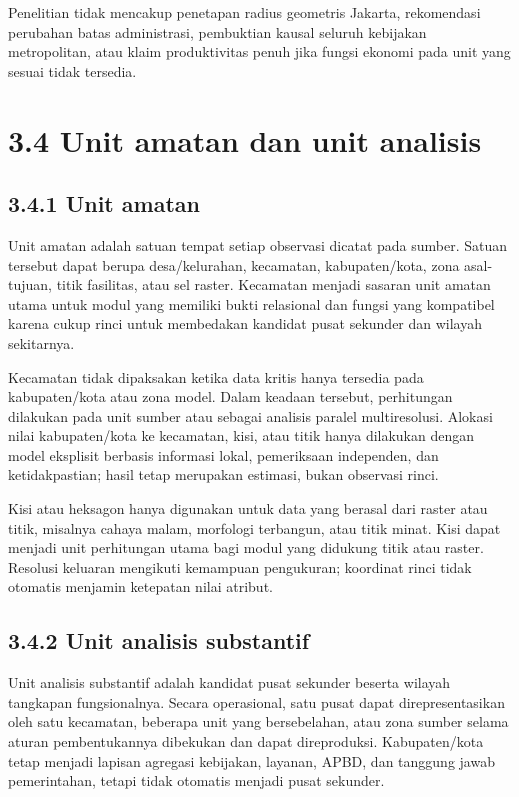 \documentclass[
  indonesian,
  11pt,
  a4paper,
  oneside,
  openany]{report}
\begin{document}
Penelitian tidak mencakup penetapan radius geometris Jakarta,
rekomendasi perubahan batas administrasi, pembuktian kausal seluruh
kebijakan metropolitan, atau klaim produktivitas penuh jika fungsi
ekonomi pada unit yang sesuai tidak tersedia.

\section{3.4 Unit amatan dan unit
analisis}\label{unit-amatan-dan-unit-analisis}

\subsection{3.4.1 Unit amatan}\label{unit-amatan}

Unit amatan adalah satuan tempat setiap observasi dicatat pada sumber.
Satuan tersebut dapat berupa desa/kelurahan, kecamatan, kabupaten/kota,
zona asal-tujuan, titik fasilitas, atau sel raster. Kecamatan menjadi
sasaran unit amatan utama untuk modul yang memiliki bukti relasional dan
fungsi yang kompatibel karena cukup rinci untuk membedakan kandidat
pusat sekunder dan wilayah sekitarnya.

Kecamatan tidak dipaksakan ketika data kritis hanya tersedia pada
kabupaten/kota atau zona model. Dalam keadaan tersebut, perhitungan
dilakukan pada unit sumber atau sebagai analisis paralel multiresolusi.
Alokasi nilai kabupaten/kota ke kecamatan, kisi, atau titik hanya
dilakukan dengan model eksplisit berbasis informasi lokal, pemeriksaan
independen, dan ketidakpastian; hasil tetap merupakan estimasi, bukan
observasi rinci.

Kisi atau heksagon hanya digunakan untuk data yang berasal dari raster
atau titik, misalnya cahaya malam, morfologi terbangun, atau titik
minat. Kisi dapat menjadi unit perhitungan utama bagi modul yang
didukung titik atau raster. Resolusi keluaran mengikuti kemampuan
pengukuran; koordinat rinci tidak otomatis menjamin ketepatan nilai
atribut.

\subsection{3.4.2 Unit analisis
substantif}\label{unit-analisis-substantif}

Unit analisis substantif adalah kandidat pusat sekunder beserta wilayah
tangkapan fungsionalnya. Secara operasional, satu pusat dapat
direpresentasikan oleh satu kecamatan, beberapa unit yang bersebelahan,
atau zona sumber selama aturan pembentukannya dibekukan dan dapat
direproduksi. Kabupaten/kota tetap menjadi lapisan agregasi kebijakan,
layanan, APBD, dan tanggung jawab pemerintahan, tetapi tidak otomatis
menjadi pusat sekunder.
\end{document}
